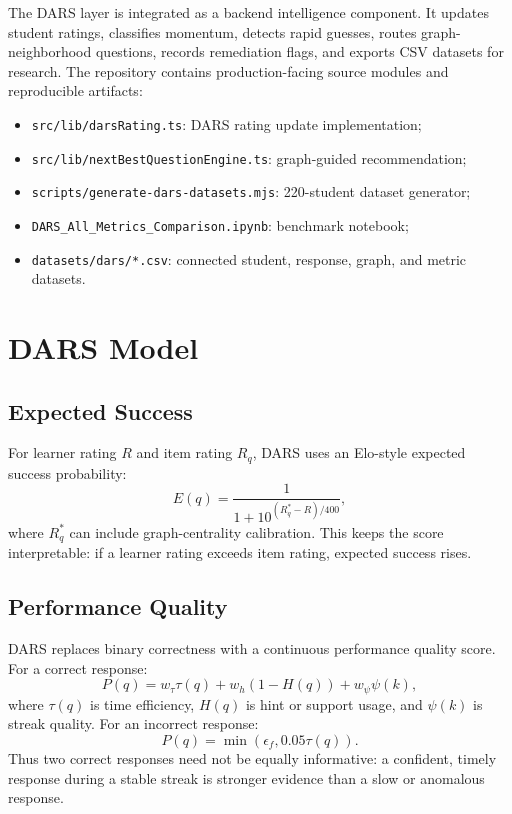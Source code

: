 \documentclass[sigconf,nonacm]{acmart}
\begin{document}
The DARS layer is integrated as a backend intelligence component. It updates student ratings, classifies momentum, detects rapid guesses, routes graph-neighborhood questions, records remediation flags, and exports CSV datasets for research. The repository contains production-facing source modules and reproducible artifacts:

\begin{itemize}[leftmargin=*]
  \item \texttt{src/lib/darsRating.ts}: DARS rating update implementation;
  \item \texttt{src/lib/nextBestQuestionEngine.ts}: graph-guided recommendation;
  \item \texttt{scripts/generate-dars-datasets.mjs}: 220-student dataset generator;
  \item \texttt{DARS\_All\_Metrics\_Comparison.ipynb}: benchmark notebook;
  \item \texttt{datasets/dars/*.csv}: connected student, response, graph, and metric datasets.
\end{itemize}

\section{DARS Model}
\subsection{Expected Success}
For learner rating $R$ and item rating $R_q$, DARS uses an Elo-style expected success probability:
\begin{equation}
E(q)=\frac{1}{1+10^{(R_q^\ast-R)/400}},
\end{equation}
where $R_q^\ast$ can include graph-centrality calibration. This keeps the score interpretable: if a learner rating exceeds item rating, expected success rises.

\subsection{Performance Quality}
DARS replaces binary correctness with a continuous performance quality score. For a correct response:
\begin{equation}
P(q)=w_\tau\tau(q)+w_h(1-H(q))+w_\psi\psi(k),
\end{equation}
where $\tau(q)$ is time efficiency, $H(q)$ is hint or support usage, and $\psi(k)$ is streak quality. For an incorrect response:
\begin{equation}
P(q)=\min(\epsilon_f, 0.05\tau(q)).
\end{equation}
Thus two correct responses need not be equally informative: a confident, timely response during a stable streak is stronger evidence than a slow or anomalous response.
\end{document}
